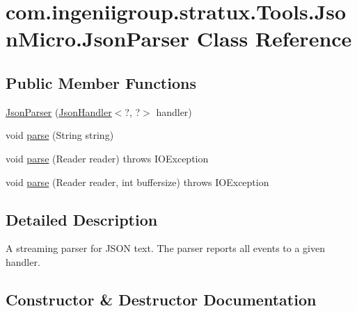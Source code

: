\hypertarget{classcom_1_1ingeniigroup_1_1stratux_1_1_tools_1_1_json_micro_1_1_json_parser}{}\section{com.\+ingeniigroup.\+stratux.\+Tools.\+Json\+Micro.\+Json\+Parser Class Reference}
\label{classcom_1_1ingeniigroup_1_1stratux_1_1_tools_1_1_json_micro_1_1_json_parser}
\subsection*{Public Member Functions}
\begin{DoxyCompactItemize}
\item 
\hyperlink{classcom_1_1ingeniigroup_1_1stratux_1_1_tools_1_1_json_micro_1_1_json_parser_ae2fafb01643d85df5586344fbe5e9bea}{Json\+Parser} (\hyperlink{classcom_1_1ingeniigroup_1_1stratux_1_1_tools_1_1_json_micro_1_1_json_handler}{Json\+Handler}$<$?, ?$>$ handler)
\item 
void \hyperlink{classcom_1_1ingeniigroup_1_1stratux_1_1_tools_1_1_json_micro_1_1_json_parser_a641caf8fbf7c1f870c1bad17681a2b53}{parse} (String string)
\item 
void \hyperlink{classcom_1_1ingeniigroup_1_1stratux_1_1_tools_1_1_json_micro_1_1_json_parser_a3a957c2de9bf6dc85e55f1a40962f7d8}{parse} (Reader reader)  throws I\+O\+Exception 
\item 
void \hyperlink{classcom_1_1ingeniigroup_1_1stratux_1_1_tools_1_1_json_micro_1_1_json_parser_aa299f60ac314414ea90ec546c60061e3}{parse} (Reader reader, int buffersize)  throws I\+O\+Exception 
\end{DoxyCompactItemize}


\subsection{Detailed Description}
A streaming parser for J\+S\+ON text. The parser reports all events to a given handler. 

\subsection{Constructor \& Destructor Documentation}
\mbox{\label{classcom_1_1ingeniigroup_1_1stratux_1_1_tools_1_1_json_micro_1_1_json_parser_ae2fafb01643d85df5586344fbe5e9bea}} 
